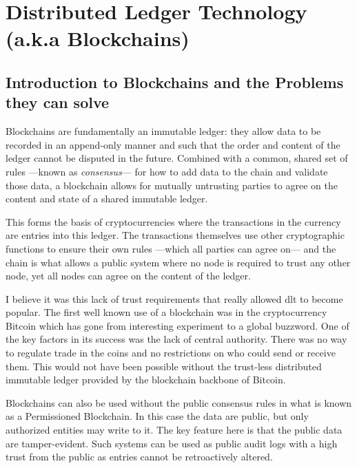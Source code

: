
\chapter{Distributed Ledger Technology (a.k.a Blockchains)}
\label{ch:blockchain}

\section{Introduction to Blockchains and the Problems they can solve}
\label{ch:blockchain:intro}

Blockchains are fundamentally an immutable ledger: they allow data to be recorded in an append-only manner and such that the order and content of the ledger cannot be disputed in the future. Combined with a common, shared set of rules ---known as \emph{consensus}--- for how to add data to the chain and validate those data, a blockchain allows for mutually untrusting parties to agree on the content and state of a shared immutable ledger.

This forms the basis of cryptocurrencies where the transactions in the currency are entries into this ledger. The transactions themselves use other cryptographic functions to ensure their own rules ---which all parties can agree on--- and the chain is what allows a public system where no node is required to trust any other node, yet all nodes can agree on the content of the ledger.

I believe it was this lack of trust requirements that really allowed \gls{dlt} to become popular. The first well known use of a blockchain was in the cryptocurrency Bitcoin which has gone from interesting experiment to a global buzzword. One of the key factors in its success was the lack of central authority. There was no way to regulate trade in the coins and no restrictions on who could send or receive them. This would not have been possible without the trust-less distributed immutable ledger provided by the blockchain backbone of Bitcoin.

Blockchains can also be used without the public consensus rules in what is known as a Permissioned Blockchain. In this case the data are public, but only authorized entities may write to it. The key feature here is that the public data are tamper-evident. Such systems can be used as public audit logs with a high trust from the public as entries cannot be retroactively altered.

